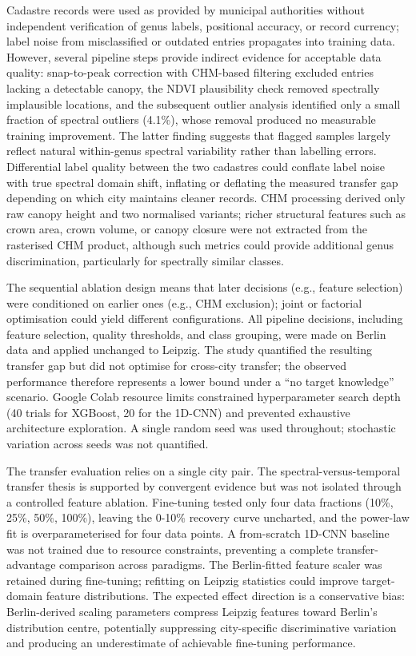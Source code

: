 \documentclass[11pt,a4paper]{scrartcl}
\begin{document}
Cadastre records were used as provided by municipal authorities without
independent verification of genus labels, positional accuracy, or record
currency; label noise from misclassified or outdated entries propagates
into training data. However, several pipeline steps provide indirect
evidence for acceptable data quality: snap-to-peak correction with
CHM-based filtering excluded entries lacking a detectable canopy, the
NDVI plausibility check removed spectrally implausible locations, and
the subsequent outlier analysis identified only a small fraction of
spectral outliers (4.1\%), whose removal produced no measurable training
improvement. The latter finding suggests that flagged samples largely
reflect natural within-genus spectral variability rather than labelling
errors. Differential label quality between the two cadastres could
conflate label noise with true spectral domain shift, inflating or
deflating the measured transfer gap depending on which city maintains
cleaner records. CHM processing derived only raw canopy height and two
normalised variants; richer structural features such as crown area,
crown volume, or canopy closure were not extracted from the rasterised
CHM product, although such metrics could provide additional genus
discrimination, particularly for spectrally similar classes.

The sequential ablation design means that later decisions (e.g., feature
selection) were conditioned on earlier ones (e.g., CHM exclusion); joint
or factorial optimisation could yield different configurations. All
pipeline decisions, including feature selection, quality thresholds, and
class grouping, were made on Berlin data and applied unchanged to
Leipzig. The study quantified the resulting transfer gap but did not
optimise for cross-city transfer; the observed performance therefore
represents a lower bound under a ``no target knowledge'' scenario.
Google Colab resource limits constrained hyperparameter search depth (40
trials for XGBoost, 20 for the 1D-CNN) and prevented exhaustive
architecture exploration. A single random seed was used throughout;
stochastic variation across seeds was not quantified.

The transfer evaluation relies on a single city pair. The
spectral-versus-temporal transfer thesis is supported by convergent
evidence but was not isolated through a controlled feature ablation.
Fine-tuning tested only four data fractions (10\%, 25\%, 50\%, 100\%),
leaving the 0-10\% recovery curve uncharted, and the power-law fit is
overparameterised for four data points. A from-scratch 1D-CNN baseline
was not trained due to resource constraints, preventing a complete
transfer-advantage comparison across paradigms. The Berlin-fitted
feature scaler was retained during fine-tuning; refitting on Leipzig
statistics could improve target-domain feature distributions. The
expected effect direction is a conservative bias: Berlin-derived scaling
parameters compress Leipzig features toward Berlin's distribution
centre, potentially suppressing city-specific discriminative variation
and producing an underestimate of achievable fine-tuning performance.
\end{document}
